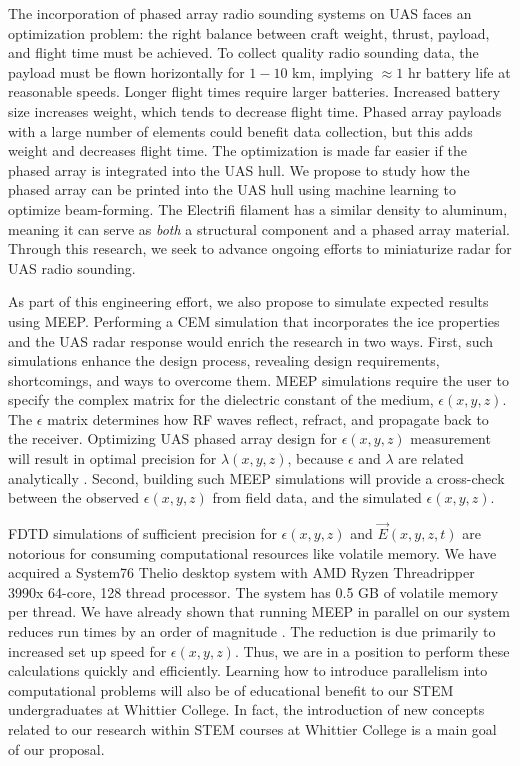 \documentclass[11pt]{amsart}
\begin{document}
The incorporation of phased array radio sounding systems on UAS faces an optimization problem: the right balance between craft weight, thrust, payload, and flight time must be achieved.  To collect quality radio sounding data, the payload must be flown horizontally for $1-10$ km, implying $\approx 1$ hr battery life at reasonable speeds.  Longer flight times require larger batteries.  Increased battery size increases weight, which tends to decrease flight time.  Phased array payloads with a large number of elements could benefit data collection, but this adds weight and decreases flight time.  The optimization is made far easier if the phased array is integrated into the UAS hull.  We propose to study how the phased array can be printed into the UAS hull using machine learning to optimize beam-forming.  The Electrifi filament has a similar density to aluminum, meaning it can serve as \textit{both} a structural component and a phased array material.  Through this research, we seek to advance ongoing efforts to miniaturize radar for UAS radio sounding.  

As part of this engineering effort, we also propose to simulate expected results using MEEP.  Performing a CEM simulation that incorporates the ice properties and the UAS radar response would enrich the research in two ways.  First, such simulations enhance the design process, revealing design requirements, shortcomings, and ways to overcome them.  MEEP simulations require the user to specify the complex matrix for the dielectric constant of the medium, $\epsilon(x,y,z)$.  The $\epsilon$ matrix  determines how RF waves reflect, refract, and propagate back to the receiver.  Optimizing UAS phased array design for $\epsilon(x,y,z)$ measurement will result in optimal precision for $\lambda(x,y,z)$, because $\epsilon$ and $\lambda$ are related analytically \cite{10.3189/2015jog14j214}.  Second, building such MEEP simulations will provide a cross-check between the observed $\epsilon(x,y,z)$ from field data, and the simulated $\epsilon(x,y,z)$. 

FDTD simulations of sufficient precision for $\epsilon(x,y,z)$ and $\vec{E}(x,y,z,t)$ are notorious for consuming computational resources like volatile memory.  We have acquired a System76 Thelio desktop system with AMD Ryzen Threadripper 3990x 64-core, 128 thread processor.  The system has 0.5 GB of volatile memory per thread.  We have already shown that running MEEP in parallel on our system reduces run times by an order of magnitude \cite{meepcon2022}.  The reduction is due primarily to increased set up speed for $\epsilon(x,y,z)$.  Thus, we are in a position to perform these calculations quickly and efficiently.  Learning how to introduce parallelism into computational problems will also be of educational benefit to our STEM undergraduates at Whittier College.  In fact, the introduction of new concepts related to our research within STEM courses at Whittier College is a main goal of our proposal.
\end{document}
